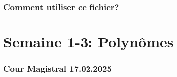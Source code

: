\documentclass{article}
\begin{document}
\section*{Comment utiliser ce fichier?}

\newpage
\tableofcontents

\newpage

\part{Semaine 1-3: Polynômes}



\section{Cour Magistral 17.02.2025}
\end{document}
